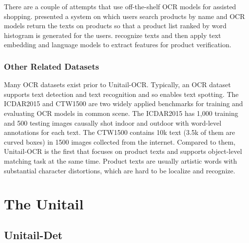 \documentclass[runningheads]{llncs}
\begin{document}
There are a couple of attempts that use off-the-shelf OCR models for assisted shopping. \cite{assist_shopping} presented a system on which users search products by name and OCR models return the texts on products so that a product list ranked by word histogram
is generated for the users. \cite{mondrianocr} recognize texts and then apply text embedding and language models to extract features for product verification.

\subsubsection{Other Related Datasets}
Many OCR datasets \cite{singh2021textocr,iiit5k,totaltext,ICDAR15,icdar2013,ctw1500,CUTE80,MSRA-TD500,Synth90k,SynthText} exist prior to Unitail-OCR. Typically, an OCR dataset supports text detection and text recognition and so enables text spotting. 
The ICDAR2015\cite{ICDAR15} and CTW1500\cite{ctw1500} are two widely applied benchmarks for training and evaluating OCR models in common scene. The ICDAR2015 has 1,000 training and 500 testing images causally shot indoor and outdoor with word-level annotations for each text. The CTW1500 contains 10k text (3.5k of them are curved boxes) in 1500 images collected from the internet. Compared to them, Unitail-OCR is the first that focuses on product texts and supports object-level matching task at the same time. Product texts are usually artistic words with substantial character distortions, which are hard to be localize and recognize. 

\section{The Unitail}

\subsection{Unitail-Det}
\end{document}
